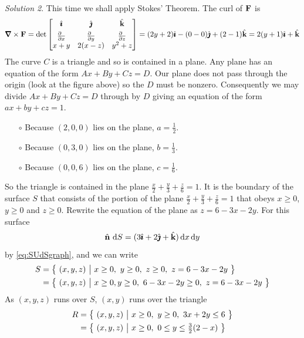 \begin{eg}
\medskip
\noindent\textit{Solution 2}. 
This time we shall apply Stokes' Theorem. The curl of $\mathbf{F}$ is
\begin{equation*}
\vnabla\times\vF
=\det\left[\begin{matrix}
          \hi & \hj &\hk \\[0.05in]
          \frac{\partial\hfill}{\partial x} &
              \frac{\partial\hfill}{\partial y} &
              \frac{\partial\hfill}{\partial z}  \\
           x+y & 2(x-z) & y^2+z
          \end{matrix}
     \right] 
=(2y+2)\hi-(0-0)\hj+(2-1)\hk=2(y+1)\hi+\hk
\end{equation*}
The curve $C$ is a triangle and so is contained in a plane.
Any plane has an equation of the form $Ax+By+Cz=D$.
Our plane does not pass through the origin (look at the figure above)
so the $D$ must be nonzero. Consequently we may divide $Ax+By+Cz=D$ through 
by $D$ giving an equation of the form $ax+by+cz=1$. 
\begin{itemize}\itemsep1pt \parskip0pt  %
\item[$\circ$] Because $(2,0,0)$ lies on the plane, $a=\frac{1}{2}$.
\item[$\circ$] Because $(0,3,0)$ lies on the plane, $b=\frac{1}{3}$.
\item[$\circ$] Because $(0,0,6)$ lies on the plane, $c=\frac{1}{6}$.
\end{itemize}
So the triangle is contained in the plane $\frac{x}{2}+\frac{y}{3}+\frac{z}{6}=1$. 
It is the boundary
of the surface $S$ that consists of the portion of the plane 
$\frac{x}{2}+\frac{y}{3}+\frac{z}{6}=1$ that obeys 
$x\ge 0$, $y\ge 0$ and $z\ge 0$. Rewrite the equation of the plane as
$z=6-3x-2y$. For this surface 
\begin{equation*}
\hn\ \dee{S}=(3\hi+2\hj+\hk)\,\dee{x}\,\dee{y}
\end{equation*} 
by \eqref{eq:SUdSgraph}, and we can write
\begin{align*}
S&=\big\{ \ (x,y,z)\ \big|\ x\ge0,\ y\ge0,\ z\ge0,\ z=6-3x-2y\ \big\} \\
&=\big\{ \ (x,y,z)\ \big|\ x\ge0, y\ge0,\ 6-3x-2y\ge0,\ z=6-3x-2y\ \big\} 
\end{align*}
As $(x,y,z)$ runs over $S$, $(x,y)$ runs over the triangle 
\begin{align*}
R&=\big\{ \ (x,y,z)\ \big|\ x\ge0,\ y\ge0,\ 3x+2y\le 6\ \big\} \\
&=\big\{ \ (x,y,z)\ \big|\ x\ge0,\  0\le y \le \tfrac{3}{2}(2-x)\ \big\} 
\end{align*}

\end{eg}
